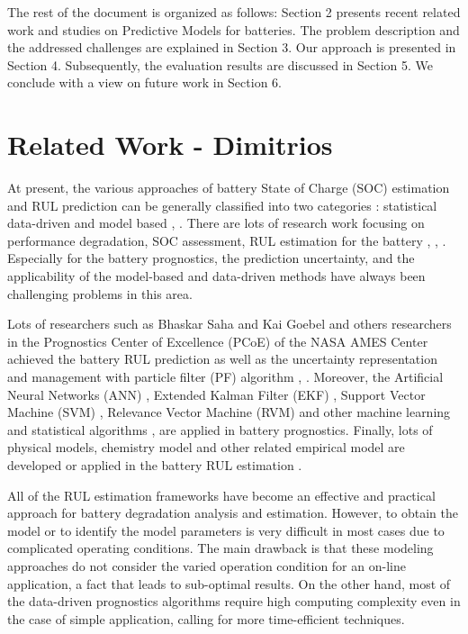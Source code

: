 The rest of the document is organized as follows: Section 2 presents recent related work and studies on Predictive Models for \lib  batteries. The problem description and the addressed challenges are explained in Section 3. Our approach is presented in Section 4. Subsequently, the evaluation results are discussed in Section 5. We conclude with a view on future work in Section 6.

\section{Related Work - Dimitrios}
At present, the various approaches of battery State of Charge (SOC) estimation and RUL prediction can be generally classified into two categories \cite{Liu:2014:LBR:2662603.2662621}: statistical data-driven and model based \cite{ZHANG20116007}, \cite{Si2011RemainingUL}. There are lots of research work focusing on performance degradation, SOC assessment, RUL estimation for the \lib battery
\cite{Bhaskar01}, \cite{4579269}, \cite{zio:hal-00609502}. Especially for the
\lib battery prognostics, the prediction uncertainty, and
the applicability of the model-based and data-driven methods have always
been challenging problems in this area.

Lots of researchers such as Bhaskar Saha and Kai Goebel
and others researchers in the Prognostics Center of
Excellence (PCoE) of the NASA AMES Center achieved
the battery RUL prediction as well as the uncertainty
representation and management with particle filter (PF)
algorithm \cite{Bhaskar01}, \cite{4579269}. Moreover, the Artificial Neural
Networks (ANN) \cite{liu_2010}, Extended Kalman
Filter (EKF) \cite{1159187}, Support Vector Machine (SVM) \cite{4655607}, Relevance
Vector Machine (RVM) \cite{doi:10.1177/0142331208092030} and other machine
learning and statistical algorithms \cite{RICHARDSON2017209}, \cite{BRONDANI2017} are applied in \lib
battery prognostics. Finally, lots of physical
models, chemistry model and other related empirical model
are developed or applied in the battery RUL estimation \cite{FLEISCHER2014276}.

All of the RUL estimation frameworks have become an effective
and practical approach for \lib battery degradation
analysis and estimation. However, to obtain the model or to identify the
model parameters is very difficult in most cases due to complicated operating conditions. The main drawback is that these modeling approaches do not consider the varied operation condition for an on-line application, a fact that leads to sub-optimal results. On the
other hand, most of the data-driven prognostics algorithms
require high computing complexity even in the case of simple application, calling for more time-efficient techniques.

